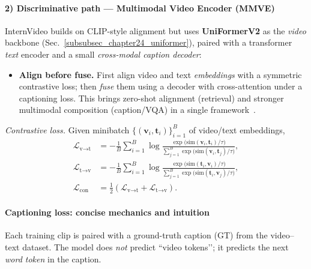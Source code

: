 \begin{enrichment}
\begin{enrichment}
        \paragraph{2) Discriminative path --- Multimodal Video Encoder (MMVE)}
        InternVideo builds on CLIP-style alignment but uses \textbf{UniFormerV2} as the \emph{video} backbone (Sec.~\ref{subsubsec_chapter24_uniformer}), paired with a transformer \emph{text} encoder and a small \emph{cross-modal caption decoder}:
        \begin{itemize}
            \item \textbf{Align before fuse.} First align video and text \emph{embeddings} with a symmetric contrastive loss; then \emph{fuse} them using a decoder with cross-attention under a captioning loss. This brings zero-shot alignment (retrieval) and stronger multimodal composition (caption/VQA) in a single framework~\cite{wang2022_internvideo,li2022_uniformerv2}. 
        \end{itemize}
        
        \emph{Contrastive loss.} Given minibatch \(\{(\bm{v}_i,\bm{t}_i)\}_{i=1}^{B}\) of video/text embeddings,
        \begin{align}
            \mathcal{L}_{\text{v}\rightarrow\text{t}}
            &= -\frac{1}{B}\sum_{i=1}^{B}
            \log\frac{\exp\big(\mathrm{sim}(\bm{v}_i,\bm{t}_i)/\tau\big)}
            {\sum_{j=1}^{B}\exp\big(\mathrm{sim}(\bm{v}_i,\bm{t}_j)/\tau\big)}, \\
            \mathcal{L}_{\text{t}\rightarrow\text{v}}
            &= -\frac{1}{B}\sum_{i=1}^{B}
            \log\frac{\exp\big(\mathrm{sim}(\bm{t}_i,\bm{v}_i)/\tau\big)}
            {\sum_{j=1}^{B}\exp\big(\mathrm{sim}(\bm{t}_i,\bm{v}_j)/\tau\big)}, \\
            \mathcal{L}_{\text{con}}&=\frac{1}{2}\left(\mathcal{L}_{\text{v}\rightarrow\text{t}}+\mathcal{L}_{\text{t}\rightarrow\text{v}}\right).
            \label{eq:internvideo_contrast}
        \end{align}
        
        \paragraph{Captioning loss: concise mechanics and intuition}
        Each training clip is paired with a ground-truth caption (GT) from the video–text dataset. The model does \emph{not} predict “video tokens’’; it predicts the next \emph{word token} in the caption. 
        

\end{enrichment}
\end{enrichment}
